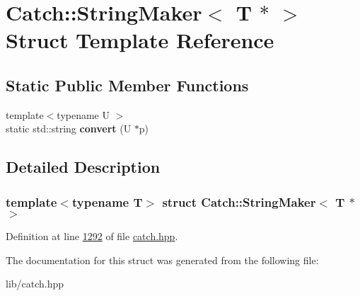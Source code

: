 \hypertarget{structCatch_1_1StringMaker_3_01T_01_5_01_4}{}\section{Catch\+::String\+Maker$<$ T $\ast$ $>$ Struct Template Reference}
\label{structCatch_1_1StringMaker_3_01T_01_5_01_4}
\subsection*{Static Public Member Functions}
\begin{DoxyCompactItemize}
\item 
\mbox{\label{structCatch_1_1StringMaker_3_01T_01_5_01_4_a2adbc75c99d71b8323f4052bcb0815c9}} 
{\footnotesize template$<$typename U $>$ }\\static std\+::string {\bfseries convert} (U $\ast$p)
\end{DoxyCompactItemize}


\subsection{Detailed Description}
\subsubsection*{template$<$typename T$>$\newline
struct Catch\+::\+String\+Maker$<$ T $\ast$ $>$}



Definition at line \mbox{\hyperlink{catch_8hpp_source_l01292}{1292}} of file \mbox{\hyperlink{catch_8hpp_source}{catch.\+hpp}}.



The documentation for this struct was generated from the following file\+:\begin{DoxyCompactItemize}
\item 
lib/catch.\+hpp\end{DoxyCompactItemize}
